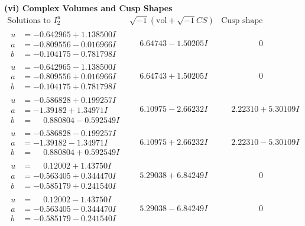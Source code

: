 \documentclass[1p]{elsarticle_modified}
\theoremstyle{definition}
\newcommand{\I}{\sqrt{-1}}
\begin{document}
\newpage\flushleft \textbf{(vi) Complex Volumes and Cusp Shapes}
$$\begin{array}{c|c|c}  
\text{Solutions to }I^u_{2}& \I (\text{vol} + \sqrt{-1}CS) & \text{Cusp shape}\\
 \hline 
\begin{aligned}
u &= -0.642965 + 1.138500 I \\
a &= -0.809556 - 0.016966 I \\
b &= -0.104175 - 0.781798 I\end{aligned}
 & \phantom{-}6.64743 - 1.50205 I & \phantom{-0.000000 } 0 \\ \hline\begin{aligned}
u &= -0.642965 - 1.138500 I \\
a &= -0.809556 + 0.016966 I \\
b &= -0.104175 + 0.781798 I\end{aligned}
 & \phantom{-}6.64743 + 1.50205 I & \phantom{-0.000000 } 0 \\ \hline\begin{aligned}
u &= -0.586828 + 0.199257 I \\
a &= -1.39182 + 1.34971 I \\
b &= \phantom{-}0.880804 - 0.592549 I\end{aligned}
 & \phantom{-}6.10975 - 2.66232 I & \phantom{-}2.22310 + 5.30109 I \\ \hline\begin{aligned}
u &= -0.586828 - 0.199257 I \\
a &= -1.39182 - 1.34971 I \\
b &= \phantom{-}0.880804 + 0.592549 I\end{aligned}
 & \phantom{-}6.10975 + 2.66232 I & \phantom{-}2.22310 - 5.30109 I \\ \hline\begin{aligned}
u &= \phantom{-}0.12002 + 1.43750 I \\
a &= -0.563405 + 0.344470 I \\
b &= -0.585179 + 0.241540 I\end{aligned}
 & \phantom{-}5.29038 + 6.84249 I & \phantom{-0.000000 } 0 \\ \hline\begin{aligned}
u &= \phantom{-}0.12002 - 1.43750 I \\
a &= -0.563405 - 0.344470 I \\
b &= -0.585179 - 0.241540 I\end{aligned}
 & \phantom{-}5.29038 - 6.84249 I & \phantom{-0.000000 } 0 \\ \hline\begin{aligned}

\end{aligned}
\end{array}$$
\end{document}

